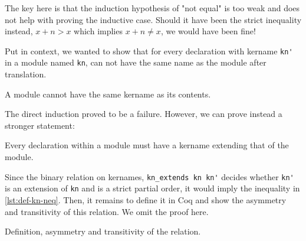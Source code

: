 The key here is that the induction hypothesis of "not equal" is too weak and
does not help with proving the inductive case. Should it have been the strict
inequality instead, $x+ n>x$ which implies $x+n\ne x$, we would have been fine!

Put in context, we wanted to show that for every declaration with kername
\verb|kn'| in a module named \verb|kn|, can not have the same name as the module
after translation.

\begin{listing}[H]
  \caption{A module cannot have the same kername as its contents.}
  \label{lst:def-kn-neq}
\end{listing}

The direct induction proved to be a failure. However, we can prove instead a
stronger statement:

\begin{listing}[H]
  \caption{Every declaration within a module must have a kername extending that of the module.}
  \label{lst:def-kn-ext}
\end{listing}

Since the binary relation on kernames, \verb|kn_extends kn kn'| decides whether
\verb|kn'| is an extension of \verb|kn| and is a strict partial order, it would
imply the inequality in \ref{lst:def-kn-neq}. Then, it remains to define it in
Coq and show the asymmetry and transitivity of this relation. We omit the proof
here.

\begin{listing}[H]
  \caption{Definition, asymmetry and transitivity of the relation.}
  \label{lst:kn-ext-po}
\end{listing}